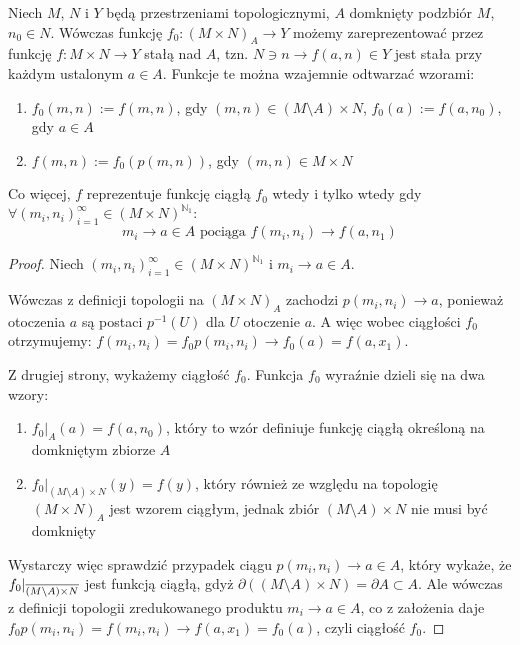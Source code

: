 \begin{prop}
  Niech $M$, $N$ i $Y$ będą przestrzeniami topologicznymi, $A$ domknięty podzbiór $M$, $n_0 \in N$. Wówczas funkcję $f_0: (M \times N)_A \rightarrow Y$ możemy zareprezentować przez funkcję $f: M \times N \rightarrow Y$ stałą nad $A$, tzn. $N \ni n \rightarrow f(a, n) \in Y$ jest stała przy każdym ustalonym $a \in A$. Funkcje te można wzajemnie odtwarzać wzorami:
  \begin{enumerate}
   \item $f_0(m,n) := f(m,n)$, gdy $(m,n) \in (M \setminus A) \times N$, $f_0(a) := f(a, n_0)$, gdy $a \in A$
   \item $f(m,n) := f_0(p(m,n))$, gdy $(m,n) \in M \times N$
  \end{enumerate}

  
  Co więcej, $f$ reprezentuje funkcję ciągłą $f_0$ wtedy i tylko wtedy gdy $\forall (m_i, n_i)_{i=1}^\infty \in (M \times N)^{\mathbb{N}_1}:$
  \[m_i \rightarrow a \in A \mbox{ pociąga } f(m_i, n_i) \rightarrow f(a, n_1)\]
  
  \begin{proof}
    Niech $(m_i, n_i)_{i=1}^\infty \in (M \times N)^{\mathbb{N}_1}$ i $m_i \rightarrow a \in A$.
    
    Wówczas z definicji topologii na $(M \times N)_A$ zachodzi $p(m_i, n_i) \rightarrow a$, ponieważ otoczenia $a$ są postaci $p^{-1}(U)$ dla $U$ otoczenie $a$. A więc wobec ciągłości $f_0$ otrzymujemy: $f(m_i, n_i) = f_0 p(m_i, n_i) \rightarrow f_0(a) = f(a, x_1)$.
    
    Z drugiej strony, wykażemy ciągłość $f_0$. Funkcja $f_0$ wyraźnie dzieli się na dwa wzory:
    \begin{enumerate}
     \item $f_0|_A(a) = f(a, n_0)$, który to wzór definiuje funkcję ciągłą określoną na domkniętym zbiorze $A$
     \item $f_0|_{(M \setminus A) \times N}(y) = f(y)$, który również ze względu na topologię $(M \times N)_A$ jest wzorem ciągłym, jednak zbiór $(M \setminus A) \times N$ nie musi być domknięty
    \end{enumerate}
    Wystarczy więc sprawdzić przypadek ciągu $p(m_i, n_i) \rightarrow a \in A$, który wykaże, że $f_0|_{\overline{(M \setminus A) \times N}}$ jest funkcją ciągłą, gdyż $\partial((M \setminus A) \times N) = \partial A \subset A$. Ale wówczas z definicji topologii zredukowanego produktu $m_i \rightarrow a \in A$, co z założenia daje $f_0 p(m_i, n_i) = f(m_i, n_i) \rightarrow f(a, x_1) = f_0(a)$, czyli ciągłość $f_0$.
  \end{proof}
\end{prop}

